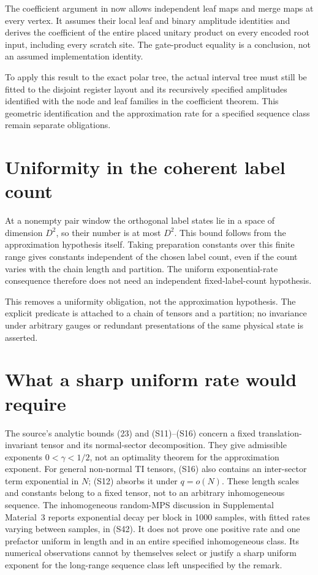 \documentclass{article}
\begin{document}
The coefficient argument in
 now allows
independent leaf maps and merge maps at every vertex. It assumes their
local leaf and binary amplitude identities and derives the coefficient
of the entire placed unitary product on every encoded root input,
including every scratch site. The gate-product equality is a conclusion,
not an assumed implementation identity.

To apply this result to the exact polar tree, the actual interval tree
must still be fitted to the disjoint register layout and its recursively
specified amplitudes identified with the node and leaf families in the
coefficient theorem. This geometric identification and the approximation
rate for a specified sequence class remain separate obligations.

\section{Uniformity in the coherent label count}
At a nonempty pair window the orthogonal label states lie in a space of
dimension $D^2$, so their number is at most $D^2$. This bound follows
from the approximation hypothesis itself. Taking preparation constants
over this finite range gives constants independent of the chosen label
count, even if the count varies with the chain length and partition.
The uniform exponential-rate consequence therefore does not need an
independent fixed-label-count hypothesis.

This removes a uniformity obligation, not the approximation hypothesis.
The explicit predicate is attached to a chain of tensors and a partition;
no invariance under arbitrary gauges or redundant presentations of the
same physical state is asserted.

\section{What a sharp uniform rate would require}
The source's analytic bounds (23) and (S11)--(S16) concern a fixed
translation-invariant tensor and its normal-sector decomposition.
They give admissible exponents $0<\gamma<1/2$, not an optimality theorem
for the approximation exponent. For general non-normal TI tensors, (S16)
also contains an inter-sector term exponential in $N$; (S12) absorbs it
under $q=o(N)$. These length scales and constants belong to a fixed tensor,
not to an arbitrary inhomogeneous sequence. The inhomogeneous random-MPS discussion
in Supplemental Material~3 reports exponential decay per block in
1000 samples, with fitted rates varying between samples, in (S42).
It does not prove one positive rate and one prefactor uniform in length
and in an entire specified inhomogeneous class. Its numerical observations
cannot by themselves select or justify a sharp uniform exponent for the
long-range sequence class left unspecified by the remark.
\end{document}
